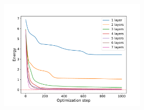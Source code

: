 \documentclass[12pt, a4paper,  nobibnotes]{article}
\begin{document}
\begin{figure}[H]
    \centering
    \includegraphics[width=0.66\textwidth]{figures/BH-layersearch-2.pdf}
    \caption{}
    \label{fig:single_layer_vqe}
\end{figure}
\end{document}
